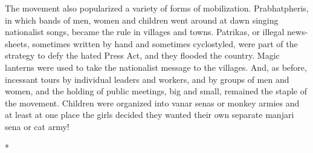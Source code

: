 \begin{multicols}{2}
The movement also popularized a variety of forms of mobilization. Prabhatpheris, in which bands of men, women and children went around at dawn singing nationalist songs, became the rule in villages and towns. Patrikas, or illegal news-sheets, sometimes written by hand and sometimes cyclostyled, were part of the strategy to defy the hated Press Act, and they flooded the country. Magic lanterns were used to take the nationalist message to the villages. And, as before, incessant tours by individual leaders and workers, and by groups of men and women, and the holding of public meetings, big and small, remained the staple of the movement. Children were organized into vanar senas or monkey armies and at least at one place the girls decided they wanted their own separate manjari sena or cat army!

\begin{center}*\end{center}

\paragraph*{}


\end{multicols}
